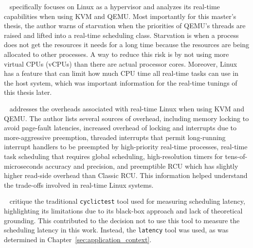 \documentclass[MMR,Master,english]{style/twbook}
\begin{document}
\bigskip \noindent \citeauthor{kiszkaLinuxRealTimeHypervisor2009}~\cite{kiszkaLinuxRealTimeHypervisor2009} specifically focuses on Linux as a hypervisor and analyzes its real-time capabilities when using KVM and QEMU. Most importantly for this master's thesis, the author warns of starvation when the priorities of QEMU's threads are raised and lifted into a real-time scheduling class. Starvation is when a process does not get the resources it needs for a long time because the resources are being allocated to other processes. A way to reduce this risk is by not using more virtual CPUs (vCPUs) than there are actual processor cores. Moreover, Linux has a feature that can limit how much CPU time all real-time tasks can use in the host system, which was important information for the real-time tunings of this thesis later.

\clearpage

\bigskip \noindent \citeauthor{mckenneyRealTimeVs2008}~\cite{mckenneyRealTimeVs2008} addresses the overheads associated with real-time Linux when using KVM and QEMU. The author lists several sources of overhead, including memory locking to avoid page-fault latencies, increased overhead of locking and interrupts due to more-aggressive preemption, threaded interrupts that permit long-running interrupt handlers to be preempted by high-priority real-time processes, real-time task scheduling that requires global scheduling, high-resolution timers for tens-of-microseconds accuracy and precision, and preemptible RCU which has slightly higher read-side overhead than Classic RCU. This information helped understand the trade-offs involved in real-time Linux systems.

\bigskip \noindent \citeauthor{deoliveiraDemystifyingRealTimeLinux2020}~\cite{deoliveiraDemystifyingRealTimeLinux2020} critique the traditional \texttt{cyclictest} tool used for measuring scheduling latency, highlighting its limitations due to its black-box approach and lack of theoretical grounding. This contributed to the decision not to use this tool to measure the scheduling latency in this work. Instead, the \texttt{latency} tool was used, as was determined in Chapter~\ref{sec:application_context}.
\end{document}

